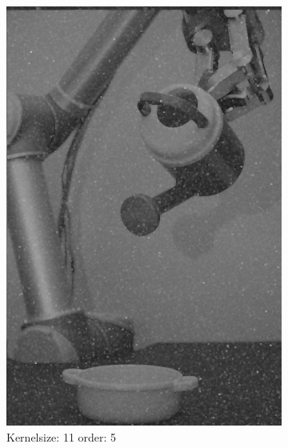 \begin{figure}[H]
\begin{subfigure}[b]{0.30\textwidth}
        \includegraphics[width=\textwidth]{img1/img_1_gaus_11_5.png}
        \caption{Kernelsize: 11 order: 5}
         \label{fig:img1_contra11_5}
    \end{subfigure}
       \begin{subfigure}[b]{0.30\textwidth}

\end{subfigure}
\end{figure}
